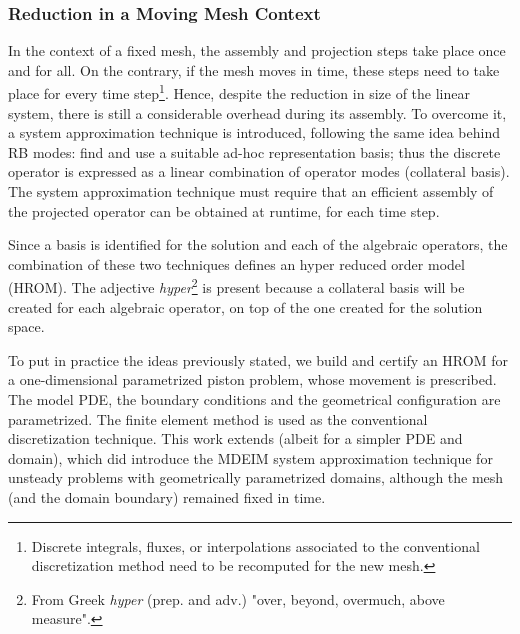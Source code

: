 \documentclass[thesis.tex]{subfiles}
\begin{document}
\subsubsection{Reduction in a Moving Mesh Context}
In the context of a fixed mesh, 
the assembly and projection steps take place once and for all.
On the contrary, if the mesh moves in time,
these steps need to take place for every time step\footnote
{
    Discrete 
    integrals,
    fluxes, 
    or interpolations 
    associated to the conventional discretization method
    need to be recomputed for the new mesh.
}.
Hence, despite the reduction in size of the linear system,
there is still a considerable overhead during its assembly.
To overcome it, a system approximation technique is introduced,
following the same idea behind RB modes: 
find and use a suitable ad-hoc representation basis;
thus the discrete operator is expressed as 
a linear combination of operator modes (collateral basis).
The system approximation technique must require that 
an efficient assembly of the projected operator can be obtained
at runtime, for each time step.

Since a basis is identified for the solution and each of the algebraic operators,
the combination of these two techniques defines an hyper reduced order model (HROM).
The adjective \mbox{\textit{hyper}}\footnote{
    From Greek \textit{hyper} (prep. and adv.) 
    "over, beyond, overmuch, above measure".
} is present because 
a collateral basis will be created for each algebraic operator,
on top of the one created for the solution space.

To put in practice the ideas previously stated, 
we build and certify an HROM 
for a one-dimensional parametrized piston problem, 
whose movement is prescribed.
The model PDE, the boundary conditions and 
the geometrical configuration are parametrized.
The finite element method is used as the conventional discretization technique.
This work extends 
\cite{Santo_Manzoni_2019,
2015_efficientModelReductionParametrizedSystemsMatrixDeim_Negri}
(albeit for a simpler PDE and domain), 
which did introduce the MDEIM system approximation technique 
for unsteady problems with geometrically parametrized domains, 
although the mesh (and the domain boundary) remained fixed in time.
\end{document}

